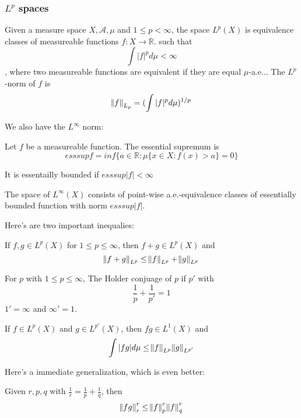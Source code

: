 \documentclass[main.tex]{subfiles}
\begin{document}
\subsubsection{$L^p$ spaces}

\begin{definition}
Given a measure space $X, \mathcal{A}, \mu$ and $1 \leq p < \infty$, the space $L^p(X)$ is equivalence classes of measureable functions $f: X \rightarrow \mathbb{R}$. such that
$$
\int |f|^p d\mu < \infty
$$, 
where two measureable functions are equivalent if they are equal $\mu$-a.e... The $L^p$-norm of $f$ is 
$$
\norm{f}_{L_p} = (\int |f|^p d\mu )^{1/p}
$$

\end{definition}
We also have the $L^\infty$ norm:
\begin{definition}
Let $f$ be a measureable function. The essential supremum is 
$$
ess sup f = inf \{a \in \mathbb{R}: \mu \{x \in X : f(x) > a \} = 0 \}
$$

It is essentailly bounded if $ess sup|f| < \infty$

The space of $L^\infty(X)$ consists of point-wise a.e.-equivalence classes of essentially bounded function with norm $ess sup|f|$.
\end{definition}

Here's are two important inequalies:

\begin{theorem}
If $f, g \in L^p(X)$ for $1 \leq p \leq \infty$, then $f + g \in L^p(X)$ and 
$$
\norm{f + g}_{L^p} \leq \norm{f}_{L^p} + \norm{g}_{L^p}
$$
\end{theorem}

\begin{definition}
For $p$ with $1 \leq p \leq \infty$, 
The Holder conjuage of $p$ if $p'$ with 
$$
\frac{1}{p} + \frac{1}{p'} = 1
$$
$1' = \infty$ and $\infty' = 1$.
\end{definition}

\begin{theorem}
If $f \in L^p(X)$ and $g \in L^{p'}(X)$, then $fg \in L^1(X)$ and 
$$
\int |fg| d\mu \leq \norm{f}_{L^p}\norm{g}_{L^{p'}}
$$
\end{theorem}

Here's a immediate generalization, which is even better:

\begin{theorem}
Given $r, p, q$ with $\frac{1}{r} = \frac{1}{p} + \frac{1}{q}$, then 
$$
\norm{fg}_r ^r \leq \norm{f}_{p} ^r \norm{f}_q ^r
$$

\end{theorem}
\end{document}
